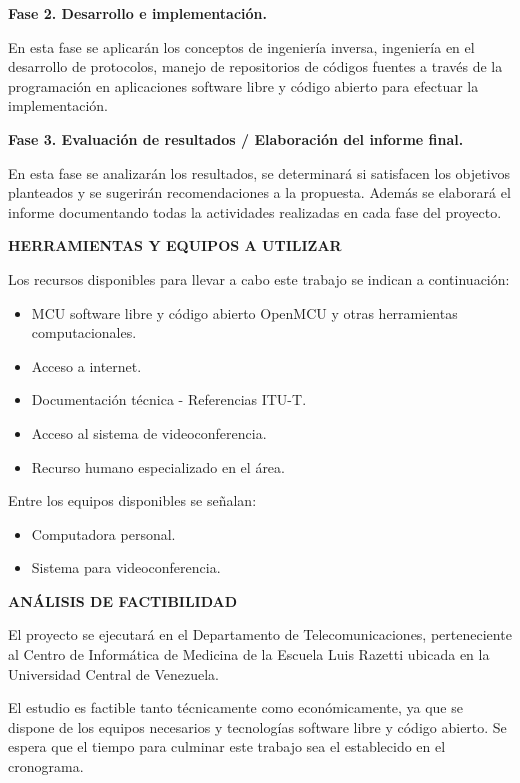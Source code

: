 \documentclass[12pt,letterpaper]{article}
\begin{document}
\textbf{Fase 2. Desarrollo e implementación.}

En esta fase se aplicarán los conceptos de ingeniería inversa, ingeniería en el desarrollo de protocolos, manejo de repositorios de códigos fuentes a través de la programación en aplicaciones software libre y código abierto para efectuar la implementación.

\textbf{Fase 3. Evaluación de resultados / Elaboración del informe final.}  

En esta fase se analizarán los resultados, se determinará si satisfacen los objetivos planteados y se sugerirán recomendaciones a la propuesta. Además se elaborará el informe documentando todas la actividades realizadas en cada fase del proyecto.

\centerline{\textbf{HERRAMIENTAS Y EQUIPOS A UTILIZAR}}

Los recursos disponibles para llevar a cabo este trabajo se indican a continuación:
\begin{itemize} 
	\item MCU software libre y código abierto OpenMCU y otras herramientas computacionales.
	\item Acceso a internet.
	\item Documentación técnica - Referencias ITU-T.
	\item Acceso al sistema de videoconferencia. 
	\item Recurso humano especializado en el área.
\end{itemize}

Entre los equipos disponibles se señalan: 
	\begin{itemize}
	\item Computadora personal.
	\item Sistema para videoconferencia.
	\end{itemize}

\centerline {\textbf{ANÁLISIS DE FACTIBILIDAD}}

El proyecto se ejecutará en el Departamento de Telecomunicaciones, perteneciente al Centro de Informática de Medicina de la Escuela Luis Razetti ubicada en la Universidad Central de Venezuela. 

El estudio es factible tanto técnicamente como económicamente, ya que se dispone de los equipos necesarios y tecnologías software libre y código abierto. Se espera que el tiempo para culminar este trabajo sea el establecido en el cronograma. 

\renewcommand{\refname}{\centerline{\normalsize REFERENCIAS BIBLIOGRÁFICAS}}
\end{document}
